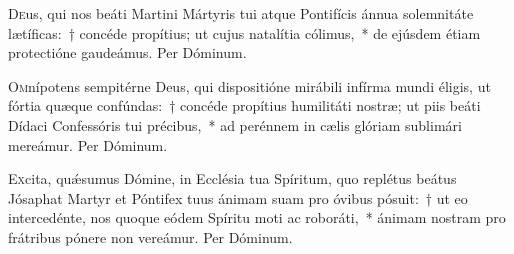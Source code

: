 \documentclass[vesperale_romanum]{subfiles}
\begin{document}

\label{112_7a_nov}



\admagnificat


\commemoration

\myrule
{}

\semiduplex


\oratio

\lettrine{D}{e}us, qui nos beáti Martini Mártyris tui atque Pontifícis ánnua solemnitáte lætíficas:~† concéde propítius; ut cujus natalítia cólimus,~* de ejúsdem étiam prote\-ctióne gaudeámus. Per Dóminum.

\capitdeseq

\myrule

\newpage
{}

\semiduplex

\oratio

\lettrine{O}{m}nípotens sempitérne Deus, qui dispositióne mirábili infírma mundi éligis, ut fórtia quæque confúndas:~† concéde propítius humilitáti nostræ; ut piis beáti Dídaci Confessóris tui précibus,~* ad perénnem in cælis glóriam sublimári mereámur. Per Dóminum.

\vespsequentiscomm


\vespsequentiscomm

\myrule


\duplex

\oratio

\lettrine{E}{x}cita, quǽsumus Dómine, in Ecclésia tua Spíritum, quo replétus beátus Jósaphat Martyr et Póntifex tuus ánimam suam pro óvibus pósuit:~† ut eo intercedénte, nos quoque eódem Spíritu moti ac roboráti,~* ánimam nostram pro frátribus pónere non vereámur. Per Dóminum.
\end{document}
